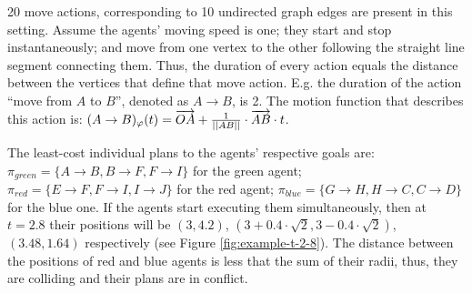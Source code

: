 \documentclass[review]{elsarticle}
\newcommand\konstantin[1]{\nb{\textbf{Konstantin:}}{red}{#1}}
\newcommand\roni[1]{\nb{\textbf{Roni:}}{green}{#1}}
\begin{document}
20 move actions, corresponding to 10 undirected graph edges are present in this setting. Assume the agents' moving speed is one; they start and stop instantaneously; and move from one vertex to the other following the straight line segment connecting them. Thus, the duration of every action equals the distance between the vertices that define that move action. E.g. the duration of the action ``move from $A$ to $B$'', denoted as $A \rightarrow B$, is 2. The motion function that describes this action is: $(A \rightarrow B)_\varphi(t) = \overrightarrow{OA} + {1\over{||AB||}} \cdot \overrightarrow{AB} \cdot t$.

The least-cost individual plans to the agents' respective goals are: $\pi_{green}=\{A \rightarrow B, B \rightarrow F, F \rightarrow I\}$ for the green agent; $\pi_{red}=\{E \rightarrow F, F \rightarrow I, I \rightarrow J\}$ for the red agent; $\pi_{blue}=\{G \rightarrow H, H \rightarrow C, C \rightarrow D\}$ for the blue one. If the agents start executing them simultaneously, then at $t=2.8$ their positions will be $(3, 4.2)$, $(3+0.4\cdot \sqrt{2}, 3-0.4\cdot \sqrt{2})$, $(3.48, 1.64)$  respectively (see Figure \ref{fig:example-t-2-8}). The distance between the positions of red and blue agents is less that the sum of their radii, thus, they are colliding and their plans are in conflict. 



\end{document}
